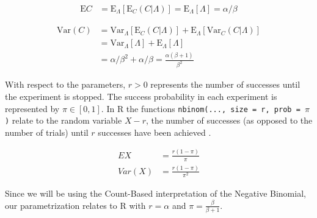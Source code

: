 \begin{align*}
\textrm{E}C &= \textrm{E}_{\Lambda}[\textrm{E}_{C} (C|\Lambda)] = \textrm{E}_{\Lambda}[\Lambda] = \alpha/\beta
\end{align*}

\begin{align*}
\textrm{Var}(C) &= \textrm{Var}_{\Lambda}[\textrm{E}_{C} (C|\Lambda)] + \textrm{E}_{\Lambda}[\textrm{Var}_C(C|\Lambda)]\\
&=\textrm{Var}_{\Lambda}[\Lambda] + \textrm{E}_{\Lambda}[\Lambda] \\
&=\alpha/\beta^2 + \alpha/\beta = \frac{\alpha(\beta+1)}{\beta^2}
\end{align*}

With respect to the parameters, $r>0$ represents the number of successes until 
the experiment is stopped. The success probability in each experiment is 
represented by $\pi\in[0,1]$.  In R the functions \texttt{nbinom(..., size = r, prob = $\pi$)} relate to the random variable $X-r$, the number of successes (as opposed to the number of trials) until $r$ successes have been achieved \citep{held2014applied}. 

\begin{align*}
EX & = \frac{r(1-\pi)}{\pi}\\
Var(X) & = \frac{r(1-\pi)}{\pi^2}
\end{align*}

Since we will be using the Count-Based interpretation of the Negative Binomial, our parametrization relates to R with $r = \alpha$ and $\pi = \frac{\beta}{\beta+1}$.
% 
% 


